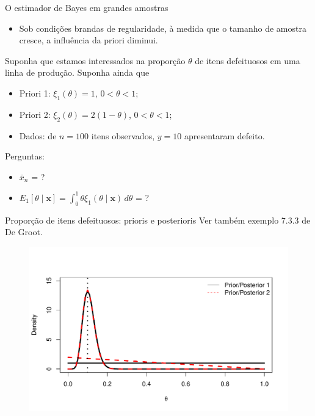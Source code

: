 \begin{frame}{O estimador de Bayes em grandes amostras}
\begin{itemize}
 \item Sob condições brandas de regularidade, à medida que o tamanho de amostra cresce, a influência da priori diminui.
\end{itemize}

\begin{exemplo}
Suponha que estamos interessados na proporção $\theta$ de itens defeituosos em uma linha de produção.
Suponha ainda que
\begin{itemize}
 \item Priori 1: $\xi_1(\theta) = 1$, $0 < \theta < 1$;
 \item Priori 2: $\xi_2(\theta) = 2(1-\theta)$, $0 < \theta < 1$;
 \item Dados: de $n = 100$ itens observados, $y = 10$ apresentaram defeito.
\end{itemize}

Perguntas:
\begin{itemize}
 \item $\bar{x}_n$ = ?
 \item $E_1[\theta \mid \boldsymbol{x}] = \int_{0}^1 \theta \xi_1(\theta \mid \boldsymbol{x})\,d\theta$ = ?
\end{itemize} 
\end{exemplo}
\end{frame}

\begin{frame}{Proporção de itens defeituosos: prioris e posterioris}
Ver também exemplo 7.3.3 de De Groot.
\begin{figure}[!ht]
\label{fig:defect_items}
\begin{center}
\includegraphics[scale=0.65]{figures/defeituosos.pdf} 
\end{center} 
\end{figure} 
\end{frame}


